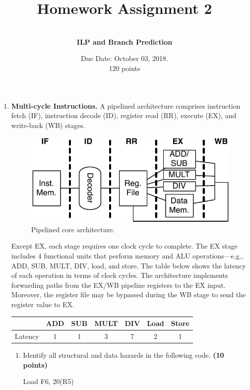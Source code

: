 \documentclass[a4paper, 11pt]{exam}
\title{Homework Assignment 2}
\subtitle{CS/ECE 6810: Computer Architecture \\
September 26,2018
\\
Name: Jake Pitkin

UID: u0891770 }
\author{ \\
\textbf{ILP and Branch Prediction}}
\date{Due Date: October 03, 2018.\\
120 points}
\begin{document}
\maketitle

\begin{enumerate}

\item \textbf{Multi-cycle Instructions.}
A pipelined architecture comprises instruction fetch (IF), instruction decode (ID), register read (RR), execute (EX), and write-back (WB) stages.
\begin{figure}[!h]
	\centering
	\includegraphics[width=0.5\linewidth]{q1}
	\caption{Pipelined core architecture.}
	\label{fig:q1}
\end{figure}

Except EX, each stage requires one clock cycle to complete.
The EX stage includes 4 functional units that perform memory and ALU operations---e.g., ADD, SUB, MULT, DIV, load, and store.
The table below shows the latency of each operation in terms of clock cycles.
The architecture implements forwarding paths from the EX/WB pipeline registers to the EX input.
Moreover, the register file may be bypassed during the WB stage to send the register value to EX.

\begin{center}
\begin{tabular}{ |c|c|c|c|c|c|c| } 
 \hline
  & ADD & SUB & MULT & DIV & Load & Store \\ 
  \hline
 Latency & 1 & 1 & 3 & 7 & 2 & 1 \\ 
 \hline
\end{tabular}
\end{center}

\begin{enumerate}



\item Identify all structural and data hazards in the following code. \textbf {(10 points)}


\begin {center}
Load F6, 20(R5) 


\end{center}
\end{enumerate}
\end{enumerate}
\end{document}
